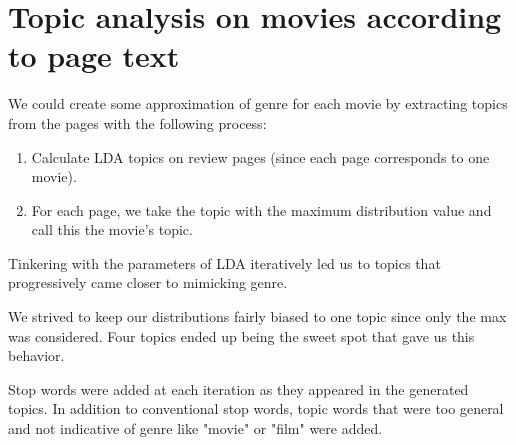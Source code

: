 \documentclass[11pt]{article}
\begin{document}
\section{Topic analysis on movies according to page text}

We could create some approximation of genre for each movie by extracting topics from the pages with the following process:

\begin{enumerate}
    \item Calculate LDA topics on review pages (since each page corresponds to one movie).
    \item For each page, we take the topic with the maximum distribution value and call this the movie's topic.
\end{enumerate}

Tinkering with the parameters of LDA iteratively led us to topics that progressively came closer to mimicking genre.

We strived to keep our distributions fairly biased to one topic since only the max was considered. Four topics
ended up being the sweet spot that gave us this behavior.

Stop words were added at each iteration as they appeared in the generated topics. In addition to conventional stop words,
topic words that were too general and not indicative of genre like "movie" or "film" were added.
\end{document}
